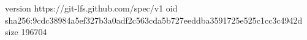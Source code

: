 version https://git-lfs.github.com/spec/v1
oid sha256:9cdc38984a5ef327b3a0adf2c563cda5b727eeddba3591725e525c1cc3c4942d
size 196704
